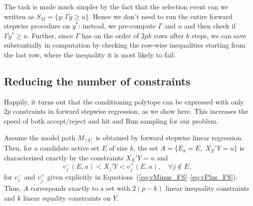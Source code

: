 \documentclass{article}
\begin{document}
The task is made much simpler by the fact that the selection event can we written as $S_M=\{y: \Gamma y \geq u\}$.
Hence we don't need to run the entire forward stepwise procedure on $y^*$: instead, we pre-compute $\Gamma$ and $u$ and then check
if $\Gamma y^* \geq u$. Further, since $\Gamma$ has on the  order of $2pk$ rows after $k$ steps,  we can save 
substantially in computation by checking the row-wise inequalities starting from the last row, where the inequality  it is most likely to fail.

\subsection{Reducing the number of constraints}
Happily, it turns out that the conditioning polytope can be expressed with only $2p$ constraints in forward stepwise regression, as we show here.
This increases the speed of both accept/reject and hit and Run sampling for our problem.

\begin{theorem}
  Assume the model path $M_{[d]}$ is obtained by forward stepwise 
  linear regression. Then, for a candidate active set $E$ of size $k$, 
  the set $A = \{E_k = E, \;X_E'Y = u\}$ is characterized 
  exactly by the constraints $X_E'Y=u$ and
  \[
  v_j^-(E,u) < X_j'Y < v_j^+(E,u), \quad\forall j \notin E,
  \]
  for $v_j^-$ and $v_j^+$ given explicitly in
  Equations~(\ref{eq:vMinus_FS}--\ref{eq:vPlus_FS}).
  Thus, $A$ corresponds exactly to 
  a set with $2(p-k)$ linear inequality constraints and $k$
  linear equality constraints on $Y$.
\end{theorem}
\end{document}

